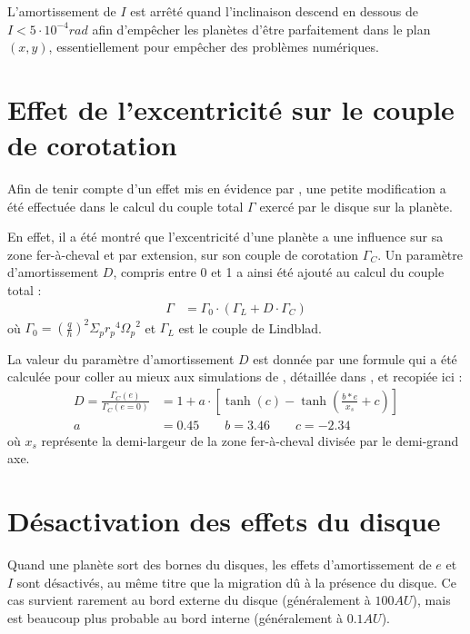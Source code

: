 L'amortissement de $I$ est arrêté quand l'inclinaison descend en dessous de $I<5\cdot 10^{-4}\unit{rad}$ afin d'empêcher les planètes d'être parfaitement dans le plan $(x,y)$, essentiellement pour empêcher des problèmes numériques.

\section{Effet de l'excentricité sur le couple de corotation}
Afin de tenir compte d'un effet mis en évidence par \cite{bitsch2010orbital}, une petite modification a été effectuée dans le calcul du couple total $\Gamma$ exercé par le disque sur la planète. 

En effet, il a été montré que l'excentricité d'une planète a une influence sur sa zone fer-à-cheval et par extension, sur son couple de corotation $\Gamma_C$. Un paramètre d'amortissement $D$, compris entre 0 et 1 a ainsi été ajouté au calcul du couple total :
\begin{align}
\Gamma &= \Gamma_0 \cdot (\Gamma_L + D\cdot \Gamma_C)
\end{align}
où $\Gamma_0 = \left(\frac{q}{h}\right)^2\Sigma_p {r_p}^4 {\Omega_p}^2$ et $\Gamma_L$ est le couple de Lindblad.

La valeur du paramètre d'amortissement $D$ est donnée par une formule qui a été calculée pour coller au mieux aux simulations de \cite{bitsch2010orbital}, détaillée dans \cite{cossou2013convergence}, et recopiée ici : 
\begin{subequations}
\begin{align}
D = \frac{\Gamma_C(e)}{\Gamma_C (e=0)} &= 1 + a \cdot \left[\tanh(c) - \tanh\left(\frac{b * e}{x_s}+c\right)\right]\label{eq:eccentricity-influence}\\
a &= 0.45 \qquad b=3.46 \qquad c= -2.34
\end{align}
\end{subequations}
où $x_s$ représente la demi-largeur de la zone fer-à-cheval divisée par le demi-grand axe.

\section{Désactivation des effets du disque}
Quand une planète sort des bornes du disques, les effets d'amortissement de $e$ et $I$ sont désactivés, au même titre que la migration dû à la présence du disque. Ce cas survient rarement au bord externe du disque (généralement à $100\unit{AU}$), mais est beaucoup plus probable au bord interne (généralement à $0.1\unit{AU}$).

